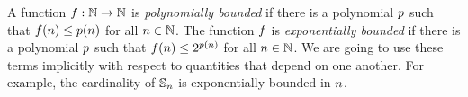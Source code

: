 
A function $f : \mathbb{N} \to \mathbb{N}$ is \emph{polynomially bounded} if there is a
polynomial $p$ such that $f(n) \leq p(n)$ for all $n\in\mathbb{N}$.
The function $f$ is \emph{exponentially bounded} if there is a polynomial
$p$ such that $f(n) \leq 2^{p(n)}$ for all $n\in\mathbb{N}$.
We are going to use these terms implicitly with respect to quantities that
depend on one another. For example, the cardinality of $\mathbb{S}_{n}$ is
exponentially bounded in $n$.
